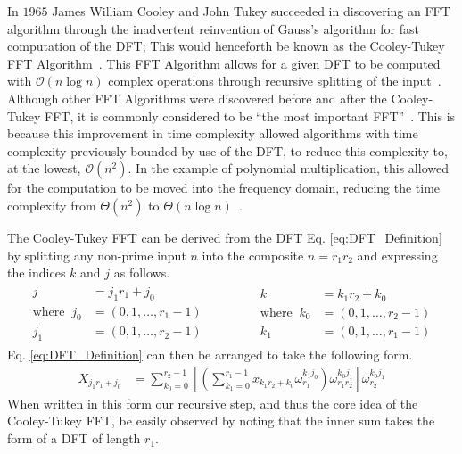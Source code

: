 In $1965$ James William Cooley and John Tukey succeeded in discovering an FFT algorithm through the inadvertent reinvention of Gauss's algorithm for fast computation of the DFT; This would henceforth be known as the Cooley-Tukey FFT Algorithm~\cite{Cooley1965}\cite{Heideman1985}.
This FFT Algorithm allows for a given DFT to be computed with $\mathcal{O}\left(n\log n\right)$ complex operations through recursive splitting of the input~\cite{Cooley1965}.
Although other FFT Algorithms were discovered before and after the Cooley-Tukey FFT, it is commonly considered to be ``the most important FFT''~\cite{Frigo2005}.
This is because this improvement in time complexity allowed algorithms with 
time complexity previously bounded by use of the DFT, to reduce this complexity 
to, at the lowest, $\mathcal{O}\left(n^2\right)$.
In the example of polynomial multiplication, this allowed for the computation
to be moved into the frequency domain, reducing the time complexity from 
$\Theta\left(n^2\right)$ to $\Theta\left(n\log n\right)$~\cite{IntroToAlgos}.


The Cooley-Tukey FFT can be derived from the DFT Eq. \ref{eq:DFT_Definition} by splitting any non-prime input $n$ into the composite $n=r_1r_2$ and expressing the indices $k$ and $j$ as follows.
\begin{align}\label{eq:IndexManipulation}
    \begin{aligned}
        j&=j_1r_1+j_0 \\
        \text{where }~
        j_0&=(0,1,\dots,r_1-1) \\
        j_1&=(0,1,\dots,r_2-1) 
    \end{aligned}
    \begin{aligned}
        &~&~&~
    \end{aligned}
    \begin{aligned}
        k&=k_1r_2+k_0 \\
        \text{where }~k_0&=(0,1,\dots,r_2-1) \\
        k_1&=(0,1,\dots,r_1-1)
    \end{aligned}
\end{align}
Eq. \ref{eq:DFT_Definition} can then be arranged to take the following form.
\begin{align}
    X_{j_1r_1+j_0}&=\sum^{r_2-1}_{k_0=0}\left[\left(\sum^{r_1-1}_{k_1=0}x_{k_1r_2+k_0}\omega_{r_1}^{k_1j_0}\right)\omega_{r_1r_2}^{k_0j_1}\right]\omega_{r_2}^{k_0j_1}
    \label{eq:FFTDefinitionFromDFT}
\end{align}
When written in this form our recursive step, and thus the core idea of the Cooley-Tukey FFT, be easily observed by noting that the inner sum takes the form of a DFT of length $r_1$.


